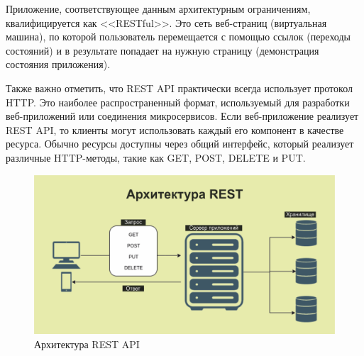 


Приложение, соответствующее данным архитектурным ограничениям, квалифицируется как <<RESTful>>. Это сеть веб-страниц (виртуальная машина), по которой пользователь перемещается с помощью ссылок (переходы состояний) и в результате попадает на нужную страницу (демонстрация состояния приложения).

Также важно отметить, что REST API практически всегда использует протокол HTTP. Это наиболее распространенный формат, используемый для разработки веб-приложений или соединения микросервисов. Если веб-приложение реализует REST API, то клиенты могут использовать каждый его компонент в качестве ресурса. Обычно ресурсы доступны через общий интерфейс, который реализует различные HTTP-методы, такие как GET, POST, DELETE и PUT.


\begin{figure}[h]
	\centering
	\includegraphics[width=\textwidth ]{img/REST.png}
	\caption{Архитектура REST API}
	\label{fig:REST}
\end{figure} 

